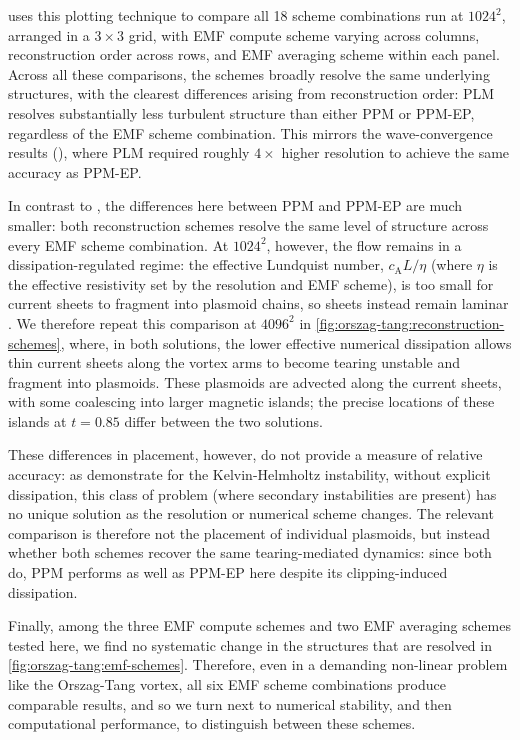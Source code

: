  uses this plotting technique to compare all 18 scheme combinations run at $1024^2$, arranged in a $3\times 3$ grid, with EMF compute scheme varying across columns, reconstruction order across rows, and EMF averaging scheme within each panel. Across all these comparisons, the schemes broadly resolve the same underlying structures, with the clearest differences arising from reconstruction order: PLM resolves substantially less turbulent structure than either PPM or PPM-EP, regardless of the EMF scheme combination. This mirrors the wave-convergence results (), where PLM required roughly $4\times$ higher resolution to achieve the same accuracy as PPM-EP.

In contrast to , the differences here between PPM and PPM-EP are much smaller: both reconstruction schemes resolve the same level of structure across every EMF scheme combination. At $1024^2$, however, the flow remains in a dissipation-regulated regime: the effective Lundquist number, $c_\mathrm{A}L/\eta$ (where $\eta$ is the effective resistivity set by the resolution and EMF scheme), is too small for current sheets to fragment into plasmoid chains, so sheets instead remain laminar \citep{Landi15a}. We therefore repeat this comparison at $4096^2$ in \cref{fig:orszag-tang:reconstruction-schemes}, where, in both solutions, the lower effective numerical dissipation allows thin current sheets along the vortex arms to become tearing unstable and fragment into plasmoids. These plasmoids are advected along the current sheets, with some coalescing into larger magnetic islands; the precise locations of these islands at $t = 0.85$ differ between the two solutions.

These differences in placement, however, do not provide a measure of relative accuracy: as \citet{Lecoanet16a} demonstrate for the Kelvin-Helmholtz instability, without explicit dissipation, this class of problem (where secondary instabilities are present) has no unique solution as the resolution or numerical scheme changes. The relevant comparison is therefore not the placement of individual plasmoids, but instead whether both schemes recover the same tearing-mediated dynamics: since both do, PPM performs as well as PPM-EP here despite its clipping-induced dissipation.

Finally, among the three EMF compute schemes and two EMF averaging schemes tested here, we find no systematic change in the structures that are resolved in \cref{fig:orszag-tang:emf-schemes}. Therefore, even in a demanding non-linear problem like the Orszag-Tang vortex, all six EMF scheme combinations produce comparable results, and so we turn next to numerical stability, and then computational performance, to distinguish between these schemes.

